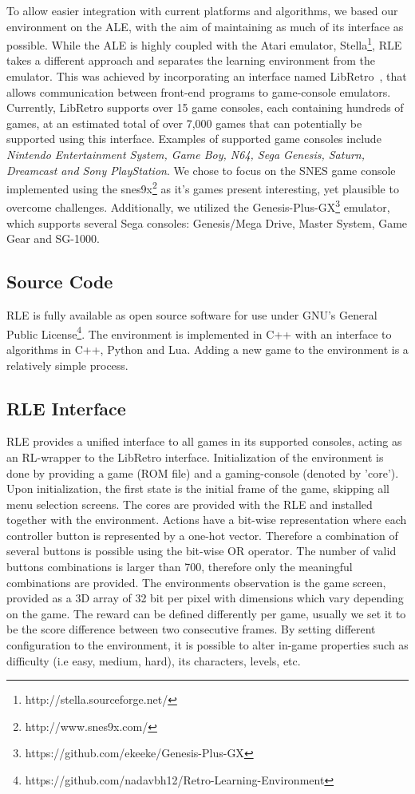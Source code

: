 \documentclass{article}
\begin{document}
To allow easier integration with current platforms and algorithms, we based our environment on the ALE, with the aim of maintaining as much of its interface as possible. While the ALE is highly coupled with the Atari emulator, Stella\footnote{http://stella.sourceforge.net/}, RLE takes a different approach and separates the learning environment from the emulator. This was achieved by incorporating an interface named 
 LibRetro~\citep{LibRetro}, that allows communication between front-end programs to game-console emulators. Currently, LibRetro supports over 15 game consoles, each containing hundreds of games, at an estimated total of over 7,000 games that can potentially be supported using this interface. Examples of supported game consoles include \textit{Nintendo Entertainment System, Game Boy, N64, Sega Genesis, Saturn, Dreamcast and Sony PlayStation}. We chose to focus on the SNES game console implemented using the snes9x\footnote{http://www.snes9x.com/} as it's games present interesting, yet plausible to overcome challenges. Additionally, we utilized the Genesis-Plus-GX\footnote{https://github.com/ekeeke/Genesis-Plus-GX} emulator, which supports several Sega consoles: Genesis/Mega Drive, Master System, Game Gear and SG-1000.

\subsection{Source Code}
RLE is fully available as open source software for use under GNU's General Public License\footnote{\label{website}https://github.com/nadavbh12/Retro-Learning-Environment}. The environment is implemented in C++ with an interface to algorithms in C++, Python and Lua.
Adding a new game to the environment is a relatively simple process.






\subsection{RLE Interface}
RLE provides a unified interface to all games in its supported consoles, acting as an RL-wrapper to the LibRetro interface.
Initialization of the environment is done by providing a game (ROM file) and a gaming-console (denoted by 'core'). Upon initialization, the first state is the initial frame of the game, skipping all menu selection screens. The cores are provided with the RLE and installed together with the environment.
Actions have a bit-wise representation where each controller button is represented by a one-hot vector. Therefore a combination of several buttons is possible using the bit-wise OR operator. The number of valid buttons combinations is larger than 700, therefore only the meaningful combinations are provided.
The environments observation is the game screen, provided as a 3D array of 32 bit per pixel with dimensions which vary depending on the game.
The reward can be defined differently per game, usually we set it to be the score difference between two consecutive frames.
By setting different configuration to the environment, it is possible to alter in-game properties such as difficulty (i.e easy, medium, hard), its characters, levels, etc.
\end{document}
